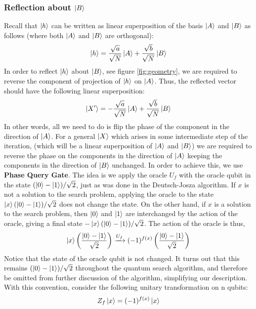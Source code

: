 \subsubsection{Reflection about $\ket{B}$} 
Recall that $\ket{h}$ can be written as linear superposition of the basis $\ket{A}$ and $\ket{B}$ as follows (where both $\ket{A}$ and $\ket{B}$ are orthogonal):
\[
\ket{h}=\frac{\sqrt{a}}{\sqrt{N}}\ket{A}+\frac{\sqrt{b}}{\sqrt{N}}\ket{B}
\]
In order to reflect $\ket{h}$ about $\ket{B}$, see figure \ref{fig:geometry}, we are required to reverse the component of projection of $\ket{h}$ on $\ket{A}$. Thus, the reflected vector should have the following linear superposition:
\[
\ket{X'}=-\frac{\sqrt{a}}{\sqrt{N}}\ket{A}+\frac{\sqrt{b}}{\sqrt{N}}\ket{B}
\]
In other words, all we need to do is flip the phase of the component in the direction of $\ket{A}$. For a general $\ket{X}$  which arises in some intermediate step of the iteration, (which will be a linear superposition of $\ket{A}$ and $\ket{B}$) we are required to reverse the phase on the components in the direction of $\ket{A}$ keeping the components in the direction of $\ket{B}$ unchanged. In order to achieve this, we use \textbf{Phase Query Gate}. The idea is we apply the oracle $U_f$ with the oracle qubit in the state $(\ket{0}-\ket{1})/\sqrt{2}$, just as was done in the Deutsch-Josza algorithm. If $x$ is not a solution to the search problem, applying the oracle to the state $\ket{x}(\ket{0}-\ket{1})/\sqrt{2}$ does not change the state. On the other hand, if $x$ is a solution to the search problem, then $\ket{0}$ and $\ket{1}$ are interchanged by the action of the oracle, giving a final state $-\ket{x}(\ket{0}-\ket{1})/\sqrt{2}$. The action of the oracle is thus,
\[
\ket{x}\left(\frac{\ket{0}-\ket{1}}{\sqrt{2}}\right) \xrightarrow{U_f} (-1)^{f(x)} \left(\frac{\ket{0}-\ket{1}}{\sqrt{2}}\right)
\]
Notice that the state of the oracle qubit is not changed. It turns out that this remains $(\ket{0}-\ket{1})/\sqrt{2}$ throughout the quantum search algorithm, and therefore be omitted from further discussion of the algorithm, simplifying our description. With this convention, consider the following unitary transformation on n qubits:
\[
Z_f\ket{x}=(-1)^{f(x)}\ket{x}
\]
